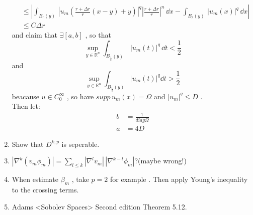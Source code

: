 \begin{enumerate}
\begin{equation*}
\begin{aligned}
    &\leq
    \left|
    \int_{
        B_r(y)
    }\,
    |
    u_m
    (\frac{r+\Delta r}{r} (x-y)+y)
    |^q
    |
    \frac{r+\Delta r}{r}
    |^n
    \,\dd x
    -
    \int_{B_r(y)}\,
    |u_m(x)|^q
    \,\dd x
    \right|
    \\
    &\leq
    C \Delta r
    \end{aligned}
    \end{equation*}
    and claim that $\exists [a,b]$ , so that 
    $$
        \sup_{y\in\mathbb{R}^n}
        \int_{
        B_{
            \frac{1}{a}
            }(y)
            }\,
        |u_m(t)|^q
        \,\dd t
        <\frac{1}{2}
    $$
    and 
    $$
    \sup_{y\in\mathbb{R}^n}\int_{
        B_{
            \frac{1}{b}
        }(y)}
        |u_m(t)|^q\dd t
        >\frac{1}{2}
    $$
    beacause $u\in C_0^{\infty}$ , so have  $supp\,u_m(x)=\Omega$ and $|u_m|^q\leq D$ .
    \\
    Then let:
    \begin{align*}
        b&=\frac{1}{diag{\Omega}}\\
        a&=4D
    \end{align*}
    \item {}%
    Show that $D^{k,p}$ is seperable.
    \item {}%
    $
    |\nabla^k (v_m \phi_m)|
    =
    \sum\limits_{l\leq k}
     |\nabla ^l v_m| 
     \,
     |\nabla ^{k-l} \phi_m|
     $?(maybe wrong!)
    
    \item {}%
    When estimate $\beta_m$ , take $p=2$ for example . Then apply Young's inequality to the crossing terms.
    \item {}%
    Adams <Sobolev Spaces> Second edition Theorem 5.12.
\end{enumerate}

